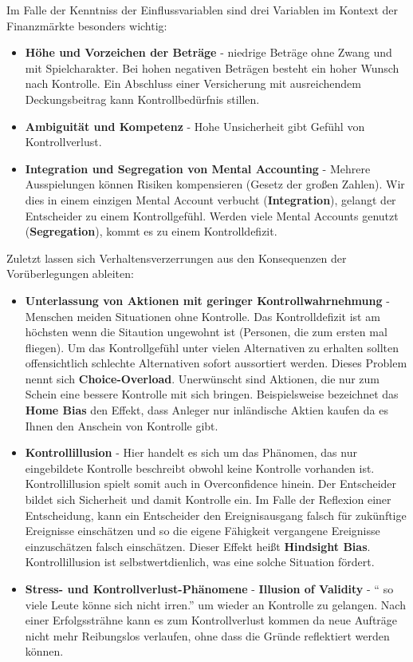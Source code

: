 Im Falle der Kenntniss der Einflussvariablen sind drei Variablen
im Kontext der Finanzmärkte besonders wichtig:
\begin{itemize}
    \item \textbf{Höhe und Vorzeichen der Beträge} - niedrige Beträge ohne Zwang und mit
        Spielcharakter. Bei hohen negativen Beträgen besteht ein hoher Wunsch
        nach Kontrolle. Ein Abschluss einer Versicherung mit ausreichendem
        Deckungsbeitrag kann Kontrollbedürfnis stillen.
    \item \textbf{Ambiguität und Kompetenz} -
        Hohe Unsicherheit gibt Gefühl von Kontrollverlust.
    \item \textbf{Integration und Segregation von Mental Accounting} - Mehrere
        Ausspielungen können Risiken kompensieren (Gesetz der großen Zahlen).
        Wir dies in einem einzigen Mental Account verbucht
        (\textbf{Integration}), gelangt der Entscheider
        zu einem Kontrollgefühl. Werden viele Mental Accounts genutzt
        (\textbf{Segregation}), kommt es zu einem Kontrolldefizit.
\end{itemize}

Zuletzt lassen sich Verhaltensverzerrungen aus den Konsequenzen
der Vorüberlegungen ableiten:
\begin{itemize}
    \item \textbf{Unterlassung von Aktionen mit geringer Kontrollwahrnehmung}
        - Menschen meiden Situationen ohne Kontrolle. Das Kontrolldefizit ist
        am höchsten wenn die Sitaution ungewohnt ist (Personen, die zum ersten
        mal fliegen). Um das Kontrollgefühl unter vielen Alternativen zu erhalten
        sollten offensichtlich schlechte Alternativen sofort aussortiert werden.
        Dieses Problem nennt sich \textbf{Choice-Overload}. Unerwünscht sind
        Aktionen, die nur zum Schein eine bessere Kontrolle mit sich bringen.
        Beispielsweise bezeichnet das \textbf{Home Bias} den Effekt, dass
        Anleger nur inländische Aktien kaufen da es Ihnen den Anschein von Kontrolle
        gibt.
    \item \textbf{Kontrollillusion} - Hier handelt es sich um das Phänomen, das
        nur eingebildete Kontrolle beschreibt obwohl keine Kontrolle
        vorhanden ist. Kontrollillusion spielt somit auch in
        Overconfidence hinein. Der Entscheider bildet sich Sicherheit und damit
        Kontrolle ein. Im Falle der Reflexion einer Entscheidung, kann ein
        Entscheider den Ereignisausgang falsch für zukünftige Ereignisse
        einschätzen und so die eigene Fähigkeit vergangene Ereignisse einzuschätzen
        falsch einschätzen. Dieser Effekt heißt \textbf{Hindsight Bias}.
        Kontrollillusion ist selbstwertdienlich, was eine solche Situation
        fördert.
    \item \textbf{Stress- und Kontrollverlust-Phänomene}
        - \textbf{Illusion of Validity} - `` so viele Leute könne sich
        nicht irren.'' um wieder an Kontrolle zu gelangen.
        Nach einer Erfolgssträhne kann es zum Kontrollverlust kommen da
        neue Aufträge nicht mehr Reibungslos verlaufen, ohne dass die Gründe
        reflektiert werden können.
\end{itemize}
